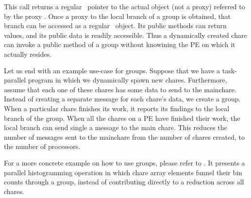 This call returns a regular \CC\ pointer to the actual object (not a proxy)
referred to by the proxy .  Once a proxy to the
local branch of a group is obtained, that branch can be accessed as a regular
\CC\ object.  Its public methods can return values, and its public data is 
readily accessible.
Thus a dynamically created chare can invoke a public method of a
group without knowining the PE on which it actually resides. 

Let us end with an example use-case for groups.
Suppose that we have a task-parallel program in which we dynamically spawn
new chares. Furthermore, assume that each one of these chares has some data
to send to the mainchare.  Instead of creating a separate message for each 
chare's data, we create a group. When a particular chare
finishes its work, it reports its findings to the local branch of the group.
When all the chares on a PE have finished their work, the local branch
can send single a message to the main chare.  This reduces the number of messages
sent to the mainchare from the number of chares created, to the number of processors. 

For a more concrete example on how to use groups, please refer to
. It presents a parallel
histogramming operation in which chare array elements funnel their bin counts
through a group, instead of contributing directly to a reduction across all
chares.

